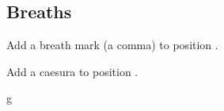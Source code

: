 \subsection{Breaths}\label{sec:inline:breaths}
\begin{command}{\tmbreath{}}
  Add a breath mark (a comma) to position .
\end{command}
\begin{command}{\tmcaesura{}}
  Add a caesura to position .
\end{command}
\begin{codeexample}[]
\begin{tmline}
\begin{tmstaff}{g}{}
\end{tmstaff}
\end{tmline}
\end{codeexample}
